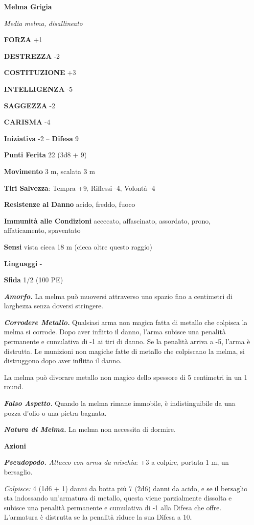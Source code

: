 \begin{multicols}{2}
\medskip{}\textbf{Melma Grigia}

\emph{Media melma, disallineato}

\textbf{FORZA} +1

\textbf{DESTREZZA} -2

\textbf{COSTITUZIONE} +3

\textbf{INTELLIGENZA} -5

\textbf{SAGGEZZA} -2

\textbf{CARISMA} -4

\textbf{Iniziativa} -2 -- \textbf{Difesa} 9

\textbf{Punti Ferita} 22 (3d8 + 9)

\textbf{Movimento} 3 m, scalata 3 m

\textbf{Tiri Salvezza}: Tempra +9, Riflessi -4, Volontà -4

\textbf{Resistenze al Danno} acido, freddo, fuoco

\textbf{Immunità alle Condizioni} accecato, affascinato, assordato, prono, affaticamento, spaventato

\textbf{Sensi} vista cieca 18 m (cieca oltre questo raggio)

\textbf{Linguaggi} -

\textbf{Sfida} 1/2 (100 PE)

\emph{\textbf{Amorfo.}} La melma può muoversi attraverso uno spazio fino a  centimetri di larghezza senza doversi stringere.

\emph{\textbf{Corrodere Metallo.}} Qualsiasi arma non magica fatta di metallo che colpisca la melma si corrode. Dopo aver inflitto il danno, l'arma subisce una penalità permanente e cumulativa di -1 ai tiri di danno. Se la penalità arriva a -5, l'arma è distrutta. Le munizioni non magiche fatte di metallo che colpiscano la melma, si distruggono dopo aver inflitto il danno.

La melma può divorare metallo non magico dello spessore di 5 centimetri in un 1 round.

\emph{\textbf{Falso Aspetto.}} Quando la melma rimane immobile, è indistinguibile da una pozza d'olio o una pietra bagnata.

\emph{\textbf{Natura di Melma.}} La melma non necessita di dormire.

\textbf{Azioni}

\emph{\textbf{Pseudopodo.} Attacco con arma da mischia}: +3 a colpire, portata 1 m, un bersaglio.

\emph{Colpisce:} 4 (1d6 + 1) danni da botta più 7 (2d6) danni da acido, e se il bersaglio sta indossando un'armatura di metallo, questa viene parzialmente dissolta e subisce una penalità permanente e cumulativa di -1 alla Difesa che offre. L'armatura è distrutta se la penalità riduce la sua Difesa a 10.


\end{multicols}
